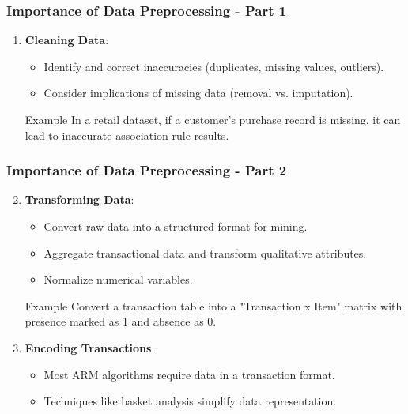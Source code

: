 \documentclass[aspectratio=169]{beamer}
\begin{document}
\begin{frame}[fragile]
    \frametitle{Importance of Data Preprocessing - Part 1}
    \begin{enumerate}
        \item \textbf{Cleaning Data}:
        \begin{itemize}
            \item Identify and correct inaccuracies (duplicates, missing values, outliers).
            \item Consider implications of missing data (removal vs. imputation).
        \end{itemize}
        \begin{block}{Example}
            In a retail dataset, if a customer's purchase record is missing, it can lead to inaccurate association rule results.
        \end{block}
    \end{enumerate}
\end{frame}

\begin{frame}[fragile]
    \frametitle{Importance of Data Preprocessing - Part 2}
    \begin{enumerate}
        \setcounter{enumi}{1}
        \item \textbf{Transforming Data}:
        \begin{itemize}
            \item Convert raw data into a structured format for mining.
            \item Aggregate transactional data and transform qualitative attributes.
            \item Normalize numerical variables.
        \end{itemize}
        \begin{block}{Example}
            Convert a transaction table into a "Transaction x Item" matrix with presence marked as 1 and absence as 0.
        \end{block}
        
        \item \textbf{Encoding Transactions}:
        \begin{itemize}
            \item Most ARM algorithms require data in a transaction format.
            \item Techniques like basket analysis simplify data representation.
        \end{itemize}
    \end{enumerate}
\end{frame}
\end{document}
